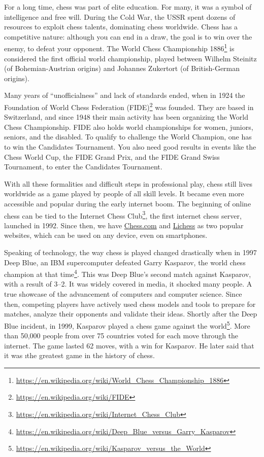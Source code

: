 For a long time, chess was part of elite education. For many, it was a symbol of intelligence and free will. During the Cold War, the USSR spent dozens of resources to exploit chess talents, dominating chess worldwide. Chess has a competitive nature: although you can end in a draw, the goal is to win over the enemy, to defeat your opponent. The World Chess Championship 1886\footnote{\url{https://en.wikipedia.org/wiki/World_Chess_Championship_1886}} is considered the first official world championship, played between Wilhelm Steinitz (of Bohemian-Austrian origins) and Johannes Zukertort (of British-German origins).

Many years of ``unofficialness'' and lack of standards ended, when in 1924 the Foundation of World Chess Federation (FIDE)\footnote{\url{https://en.wikipedia.org/wiki/FIDE}} was founded. They are based in Switzerland, and since 1948 their main activity has been organizing the World Chess Championship. FIDE also holds world championships for women, juniors, seniors, and the disabled. To qualify to challenge the World Champion, one has to win the Candidates Tournament. You also need good results in events like the Chess World Cup, the FIDE Grand Prix, and the FIDE Grand Swiss Tournament, to enter the Candidates Tournament.

With all these formalities and difficult steps in professional play, chess still lives worldwide as a game played by people of all skill levels. It became even more accessible and popular during the early internet boom. The beginning of online chess can be tied to the Internet Chess Club\footnote{\url{https://en.wikipedia.org/wiki/Internet_Chess_Club}}, the first internet chess server, launched in 1992. Since then, we have \href{https://www.chess.com/home}{Chess.com} and \href{https://lichess.org/}{Lichess} as two popular websites, which can be used on any device, even on smartphones.

Speaking of technology, the way chess is played changed drastically when in 1997 Deep Blue, an IBM supercomputer defeated Garry Kasparov, the world chess champion at that time\footnote{\url{https://en.wikipedia.org/wiki/Deep_Blue_versus_Garry_Kasparov}}. This was Deep Blue's second match against Kasparov, with a result of 3--2. It was widely covered in media, it shocked many people. A true showcase of the advancement of computers and computer science. Since then, competing players have actively used chess models and tools to prepare for matches, analyze their opponents and validate their ideas. Shortly after the Deep Blue incident, in 1999, Kasparov played a chess game against the world\footnote{\url{https://en.wikipedia.org/wiki/Kasparov_versus_the_World}}. More than 50,000 people from over 75 countries voted for each move through the internet. The game lasted 62 moves, with a win for Kasparov. He later said that it was \i{the greatest game in the history of chess}.

